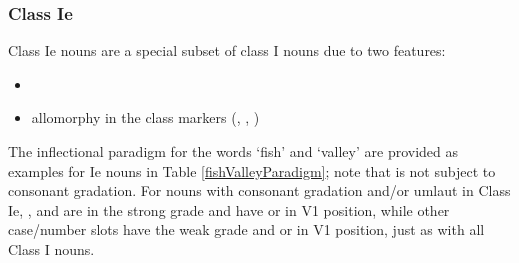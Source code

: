 \subsubsection{Class Ie}\label{NclassIe}
Class Ie nouns are a special subset of class I nouns due to two features:
\begin{itemize}
\item{\jvh{}}
\item{allomorphy in the class markers (, , )}
\end{itemize}
The inflectional paradigm for the words  ‘fish’ and  ‘valley’ are provided as examples for Ie nouns in Table \vref{fishValleyParadigm}; note that  is not subject to consonant gradation. 
For nouns with consonant gradation and/or umlaut in Class Ie, ,  and  are in the strong grade and have  or  in V1 position, while other case/number slots have the weak grade and  or  in V1 position, just as with all Class I nouns. 
